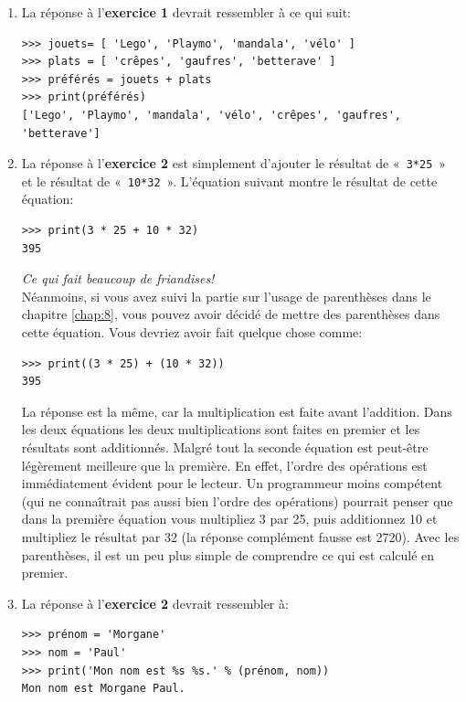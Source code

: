 \begin{enumerate}
\item La réponse à l'\textbf{exercice 1} devrait ressembler à ce qui suit:\\

\begin{small}
\begin{Verbatim}[frame=single,rulecolor=\color{mbleu}, label=à taper]
>>> jouets= [ 'Lego', 'Playmo', 'mandala', 'vélo' ]
>>> plats = [ 'crêpes', 'gaufres', 'betterave' ]
>>> préférés = jouets + plats
>>> print(préférés)
['Lego', 'Playmo', 'mandala', 'vélo', 'crêpes', 'gaufres', 'betterave']
\end{Verbatim}
\end{small}
\item  La réponse à l'\textbf{exercice 2} est simplement d'ajouter le résultat de «~\texttt{3*25}~» et le résultat de «~\texttt{10*32}~». L'équation suivant montre le résultat de cette équation:

\begin{Verbatim}[frame=single,rulecolor=\color{mbleu}, label=à taper]
>>> print(3 * 25 + 10 * 32)
395
\end{Verbatim}
\rm
\emph{Ce qui fait beaucoup de friandises!}\\

Néanmoins, si vous avez suivi la partie sur l'usage de parenthèses dans le chapitre \ref{chap:8}, vous pouvez avoir décidé de mettre des parenthèses dans cette équation. Vous devriez avoir fait quelque chose comme:
\tt
\begin{Verbatim}[frame=single,rulecolor=\color{mbleu}, label=à taper]
>>> print((3 * 25) + (10 * 32))
395
\end{Verbatim}
\rm

La réponse est la même, car la multiplication est faite avant l'addition. Dans les deux équations les deux multiplications sont faites en premier et les résultats sont additionnés. Malgré tout la seconde équation est peut-être légèrement meilleure que la première. En effet, l'ordre des opérations est immédiatement évident pour le lecteur. Un programmeur moins compétent (qui ne connaîtrait pas aussi bien l'ordre des opérations) pourrait penser que dans la première équation vous multipliez 3 par 25, puis additionnez 10 et multipliez le résultat par 32 (la réponse complément fausse est 2720). Avec les parenthèses, il est un peu plus simple de comprendre ce qui est calculé en premier.

\item  La réponse à l'\textbf{exercice 2} devrait ressembler à:
\tt
\begin{Verbatim}[frame=single,rulecolor=\color{mbleu}, label=à taper]
>>> prénom = 'Morgane'
>>> nom = 'Paul'
>>> print('Mon nom est %s %s.' % (prénom, nom))
Mon nom est Morgane Paul.
\end{Verbatim}
\rm

\end{enumerate}

